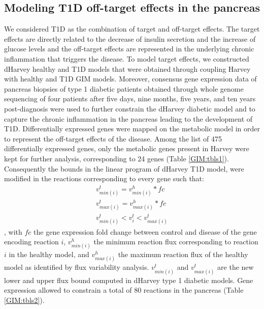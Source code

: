 \subsection{Modeling T1D off-target effects in the pancreas}
We considered T1D as the combination of target and off-target effects. The target effects are directly related to the decrease of insulin secretion and the increase of glucose levels and the off-target effects are represented in the underlying chronic inflammation that triggers the disease. To model target effects, we constructed dHarvey healthy and T1D models that were obtained through coupling Harvey with healthy and T1D GIM models. Moreover, consensus gene expression data \cite{planas2010gene} of pancreas biopsies of type 1 diabetic patients obtained through whole genome sequencing of four patients after five days, nine months, five years, and ten years post-diagnosis were used to further constrain the dHarvey diabetic model and to capture the chronic inflammation in the pancreas leading to the development of T1D. Differentially expressed genes were mapped on the metabolic model in order to represent the off-target effects of the disease. Among the list of 475 differentially expressed genes, only the metabolic genes present in Harvey were kept for further analysis, corresponding to 24 genes (Table \ref{GIM:tbls1}). 
Consequently the bounds in the linear program of dHarvey T1D model, were modified in the reactions corresponding to every gene such that:
\begin{gather*}
v_{min(i)}^t=v_{min(i)}^h*fc \\
v_{max(i)}^t=v_{max(i)}^h*fc \\
v_{min(i)}^t<v_i^t<v_{max(i)}^t
\end{gather*}
, with $fc$ the gene expression fold change between control and disease of the gene encoding reaction $i$, $v_{min(i)}^h$  the minimum reaction flux corresponding to reaction $i$ in the healthy model, and $v_{max(i)}^h$ the maximum reaction flux of the healthy model as identified by flux variability analysis. $v_{min(i)}^t$ and $v_{max(i)}^t$ are the new lower and upper flux bound computed in dHarvey type 1 diabetic models. Gene expression allowed to constrain a total of 80 reactions in the pancreas (Table \ref{GIM:tbls2}).
